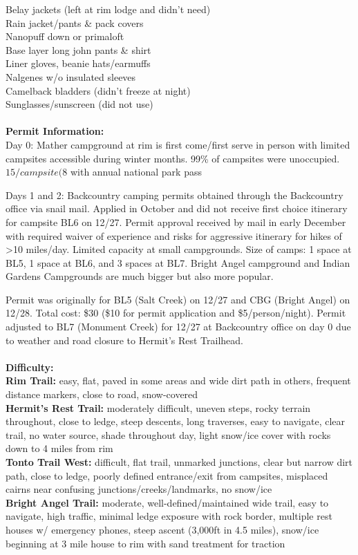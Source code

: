 \documentclass[10pt,a4paper]{article}
\begin{document}
\begin{multicols}{2}
	Belay jackets (left at rim lodge and didn't need)\\
	Rain jacket/pants \& pack covers	\\
	Nanopuff down or primaloft\\
	Base layer long john pants \& shirt\\
	Liner gloves, beanie hats/earmuffs\\
	Nalgenes w/o insulated sleeves\\
	Camelback bladders (didn't freeze at night)\\
	Sunglasses/sunscreen (did not use)
\\
\\	
\textbf{Permit Information: }\\
Day 0: Mather campground at rim is first come/first serve in person with limited campsites accessible during winter months. 99\% of campsites were unoccupied. $15/campsite ($8 with annual national park pass

Days 1 and 2: Backcountry camping permits obtained through the Backcountry office via snail mail. Applied in October and did not receive first choice itinerary for campsite BL6 on 12/27. Permit approval received by mail in early December with required waiver of experience and risks for aggressive itinerary for hikes of >10 miles/day. Limited capacity at small campgrounds. Size of camps: 1 space at BL5, 1 space at BL6, and 3 spaces at BL7. Bright Angel campground and Indian Gardens Campgrounds are much bigger but also more popular. 

Permit was originally for BL5 (Salt Creek) on 12/27 and CBG (Bright Angel) on 12/28. Total cost: \$30 (\$10 for permit application and \$5/person/night). Permit adjusted to BL7 (Monument Creek) for 12/27 at Backcountry office on day 0 due to weather and road closure to Hermit's Rest Trailhead.
\\
\\
\textbf{Difficulty: }\\
\textbf{Rim Trail:} easy, flat, paved in some areas and wide dirt path in others, frequent distance markers, close to road, snow-covered\\
\textbf{	Hermit's Rest Trail:} moderately difficult, uneven steps, rocky terrain throughout, close to ledge, steep descents, long traverses, easy to navigate, clear trail, no water source, shade throughout day, light snow/ice cover with rocks down to 4 miles from rim\\
\textbf{	Tonto Trail West:} difficult, flat trail, unmarked junctions, clear but narrow dirt path, close to ledge, poorly defined entrance/exit from campsites, misplaced cairns near confusing junctions/creeks/landmarks, no snow/ice\\
\textbf{	Bright Angel Trail:} moderate, well-defined/maintained wide trail, easy to navigate, high traffic, minimal ledge exposure with rock border, multiple rest houses w/ emergency phones, steep ascent (3,000ft in 4.5 miles), snow/ice beginning at 3 mile house to rim with sand treatment for traction


\end{multicols}
\end{document}
